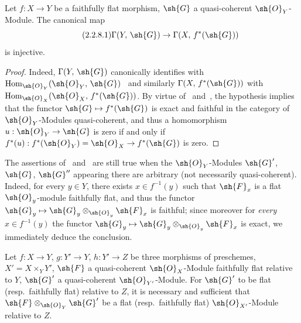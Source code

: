 \begin{corollary}[2.2.8]
\label{IV.2.2.8}
Let $f:X\to Y$ be a faithfully flat morphism, $\sh{G}$ a quasi-coherent $\sh{O}_Y$-Module.
The canonical map
\begin{equation}
\tag{2.2.8.1}
\label{IV.2.2.8.1}
  \Gamma(Y,\,\sh{G}) \to \Gamma(X,\,f^*(\sh{G}))
\end{equation}
is injective.
\end{corollary}

\begin{proof}
Indeed, $\Gamma(Y,\,\sh{G})$ canonically identifies with $\operatorname{Hom}_{\sh{O}_Y}(\sh{O}_Y,\,\sh{G})$~ and similarly $\Gamma(X,\,f^*(\sh{G}))$ with $\operatorname{Hom}_{\sh{O}_X}(\sh{O}_X,\,f^*(\sh{G}))$.
By virtue of~ and~, the hypothesis implies that the functor $\sh{G}\mapsto f^*(\sh{G})$ is exact and faithful in the category of $\sh{O}_Y$-Modules quasi-coherent, and thus a homomorphism $u:\sh{O}_Y\to\sh{G}$ is zero if and only if $f^*(u):f^*(\sh{O}_Y)=\sh{O}_X\to f^*(\sh{G})$ is zero.
\end{proof}

\begin{remark}[2.2.9]
\label{IV.2.2.9}
The assertions of~ and~ are still true when the $\sh{O}_Y$-Modules $\sh{G}'$, $\sh{G}$, $\sh{G}''$ appearing there are arbitrary (not necessarily quasi-coherent).
Indeed, for every $y\in Y$, there exists $x\in f^{-1}(y)$ such that $\sh{F}_x$ is a flat $\sh{O}_y$-module
faithfully flat, and thus the functor $\sh{G}_y\mapsto\sh{G}_y\otimes_{\sh{O}_y}\sh{F}_x$ is faithful; since moreover for \emph{every} $x\in f^{-1}(y)$ the functor $\sh{G}_y\mapsto\sh{G}_y\otimes_{\sh{O}_y}\sh{F}_x$ is exact, we immediately deduce the conclusion.
\end{remark}

\begin{proposition}[2.2.10]
\label{IV.2.2.10}
Let $f:X\to Y$, $g:Y'\to Y$, $h:Y'\to Z$ be three morphisms of preschemes, $X'=X\times_Y Y'$, $\sh{F}$ a quasi-coherent $\sh{O}_X$-Module faithfully flat relative to $Y$, $\sh{G}'$ a quasi-coherent $\sh{O}_{Y'}$-Module.
For $\sh{G}'$ to be flat \textnormal{(}resp.\ faithfully flat\textnormal{)} relative to $Z$, it is necessary and sufficient that $\sh{F}\otimes_{\sh{O}_Y}\sh{G}'$ be a flat \textnormal{(}resp.\ faithfully flat\textnormal{)} $\sh{O}_{X'}$-Module relative to $Z$.
\end{proposition}

